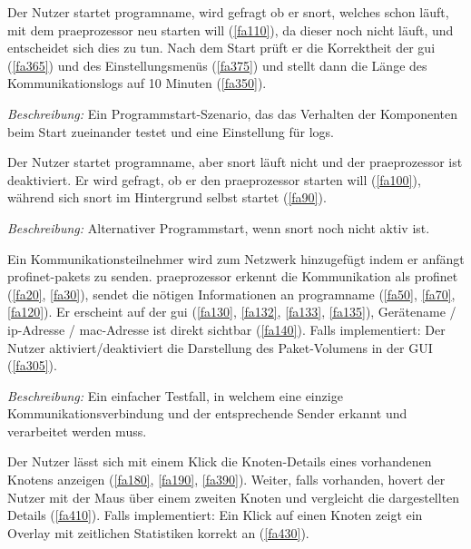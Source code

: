 \begin{description}[style=multiline, leftmargin=4cm, labelwidth=4cm]

   Der Nutzer startet \gls{programname}, wird gefragt ob er \gls{snort}, welches schon läuft, mit dem \gls{praeprozessor} neu starten will (\ref{fa110}), da dieser noch nicht läuft, und entscheidet sich dies zu tun. Nach dem Start prüft er die Korrektheit der \gls{gui} (\ref{fa365}) und des Einstellungsmenüs (\ref{fa375}) und stellt dann die Länge des Kommunikationslogs auf 10 Minuten (\ref{fa350}). \par
      \textit{Beschreibung:} Ein Programmstart-Szenario, das das Verhalten der Komponenten beim Start zueinander testet und eine Einstellung für \glspl{log}.

   Der Nutzer startet \gls{programname}, aber \gls{snort} läuft nicht und der \gls{praeprozessor} ist deaktiviert. Er wird gefragt, ob er den \gls{praeprozessor} starten will (\ref{fa100}), während sich \gls{snort} im Hintergrund selbst startet (\ref{fa90}). \par
      \textit{Beschreibung:} Alternativer Programmstart, wenn \gls{snort} noch nicht aktiv ist.

   Ein Kommunikationsteilnehmer wird zum Netzwerk hinzugefügt indem er anfängt \gls{profinet}-\glspl{paket} zu senden. \gls{praeprozessor} erkennt die Kommunikation als \gls{profinet} (\ref{fa20}, \ref{fa30}), sendet die nötigen Informationen an \gls{programname} (\ref{fa50}, \ref{fa70}, \ref{fa120}). Er erscheint auf der \gls{gui} (\ref{fa130}, \ref{fa132}, \ref{fa133}, \ref{fa135}), Gerätename / \gls{ip}-Adresse / \gls{mac}-Adresse ist direkt sichtbar (\ref{fa140}). Falls implementiert: Der Nutzer aktiviert/deaktiviert die Darstellung des Paket-Volumens in der GUI (\ref{fa305}). \par
      \textit{Beschreibung:} Ein einfacher Testfall, in welchem eine einzige Kommunikationsverbindung und der entsprechende Sender erkannt und verarbeitet werden muss.

   Der Nutzer lässt sich mit einem Klick die Knoten-Details eines vorhandenen Knotens anzeigen (\ref{fa180}, \ref{fa190}, \ref{fa390}). Weiter, falls vorhanden, hovert der Nutzer mit der Maus über einem zweiten Knoten und vergleicht die dargestellten Details (\ref{fa410}). Falls implementiert: Ein Klick auf einen Knoten zeigt ein Overlay mit zeitlichen Statistiken korrekt an (\ref{fa430}).


\end{description}
